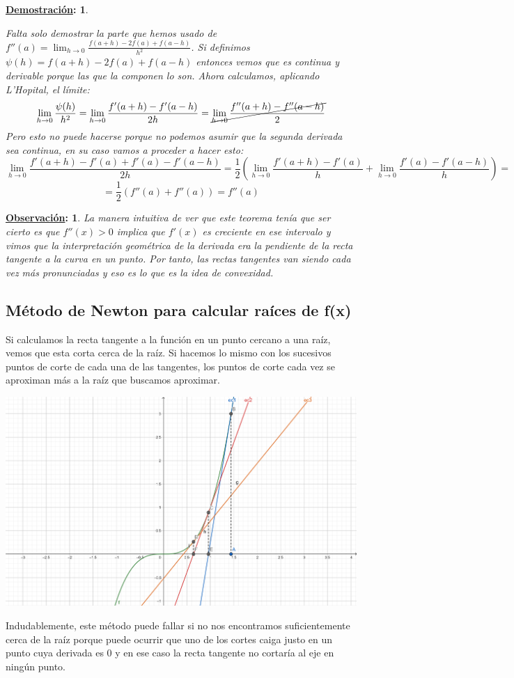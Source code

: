 \documentclass[10pt,a4paper,openright]{book}
\theoremstyle{break}
\newtheorem*{demo}{\underline{Demostración}:}
\newtheorem*{obs}{\underline{Observación}:}
\begin{document}
\begin{demo}
\begin{itemize}
Falta solo demostrar la parte que hemos usado de $f''(a)=\lim_{h\rightarrow 0 }\frac{f(a+h)-2f(a)+f(a-h)}{h^2}$. Si definimos $\psi(h) = f(a+h)-2f(a)+f(a-h)$ entonces vemos que es continua y derivable porque las que la componen lo son. Ahora calculamos, aplicando L'Hopital, el límite:
$$\lim_{h\rightarrow 0}\frac{\psi(h)}{h^2}=\lim_{h\rightarrow 0}\frac{f'(a+h)-f'(a-h)}{2h}= \cancel{\lim_{h\rightarrow 0}\frac{f''(a+h)-f''(a-h)}{2}}$$
Pero esto no puede hacerse porque no podemos asumir que la segunda derivada sea continua, en su caso vamos a proceder a hacer esto:
$$\lim_{h\rightarrow 0} \frac{f'(a+h)-f'(a)+f'(a)-f'(a-h)}{2h}= \frac{1}{2}\left(\lim_{h\rightarrow 0}\frac{f'(a+h)-f'(a)}{h}+ \lim_{h\rightarrow 0} \frac{f'(a)-f'(a-h)}{h}\right) = $$
$$=\frac{1}{2}\left(f''(a)+ f''(a)\right)=f''(a)$$
\end{itemize}
\end{demo}

\begin{obs}
La manera intuitiva de ver que este teorema tenía que ser cierto es que $f''(x)>0$ implica que $f'(x)$ es creciente en ese intervalo y vimos que la interpretación geométrica de la derivada era la pendiente de la recta tangente a la curva en un punto. Por tanto, las rectas tangentes van siendo cada vez más pronunciadas y eso es lo que es la idea de convexidad.
\end{obs}

\subsection{Método de Newton para calcular raíces de f(x)}
Si calculamos la recta tangente a la función en un punto cercano a una raíz, vemos que esta corta cerca de la raíz. Si hacemos lo mismo con los sucesivos puntos de corte de cada una de las tangentes, los puntos de corte cada vez se aproximan más a la raíz que buscamos aproximar.
\begin{center}
\includegraphics[scale=1.6]{metodo Newton}
\end{center}
Indudablemente, este método puede fallar si no nos encontramos suficientemente cerca de la raíz porque puede ocurrir que uno de los cortes caiga justo en un punto cuya derivada es 0 y en ese caso la recta tangente no cortaría al eje en ningún punto.
\end{document}
